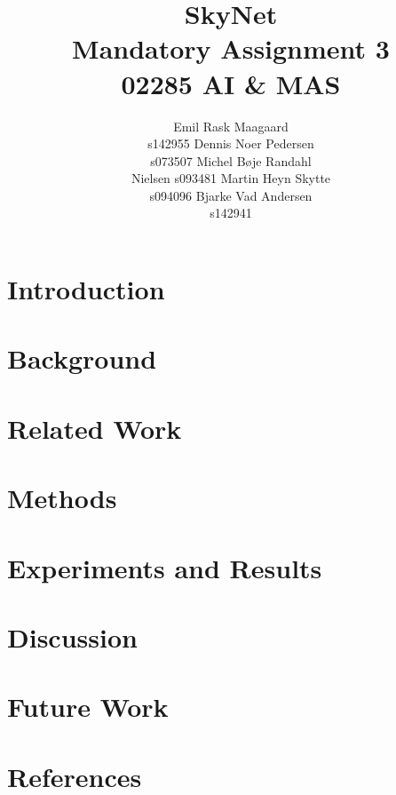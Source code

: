 \documentclass[letterpaper]{article}
\begin{document}
\title{SkyNet \\ Mandatory Assignment 3 \\ 02285 AI \& MAS}
\author{Emil Rask Maagaard \\ s142955 \And Dennis Noer Pedersen \\ s073507 \And
  Michel B\o je Randahl \\ Nielsen s093481 \AND Martin Heyn Skytte \\ s094096 \And
  Bjarke Vad Andersen \\ s142941}
\maketitle
\begin{abstract}

\end{abstract}

\section{Introduction}


\section{Background}


\section{Related Work}


\section{Methods}


\section{Experiments and Results}


\section{Discussion}


\section{Future Work}


\section{References}



\end{document}
